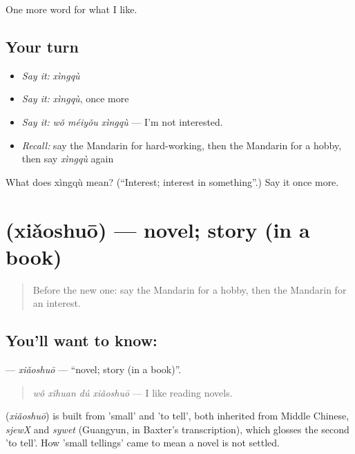 \begin{grammarlens}[title={What you've built}]
One more word for what I like.
\end{grammarlens}

\subsection*{Your turn}
\begin{itemize}
\raggedright
  \item \emph{Say it:} \emph{xìngqù}
  \item \emph{Say it:} \emph{xìngqù}, once more
  \item \emph{Say it:} \emph{wǒ méiyǒu xìngqù} — I'm not interested.
  \item \emph{Recall:} say the Mandarin for hard-working, then the Mandarin for a hobby, then say \emph{xìngqù} again
\end{itemize}

\begin{tcolorbox}[breakable,colback=teal!4,colframe=teal!35!black,title={Before you move on}]
What does xìngqù mean? (\textquotedblleft{}Interest; interest in something\textquotedblright{}.) Say it once more.
\end{tcolorbox}
\section[\texorpdfstring{\zh{小说} (xiǎoshuō)}{小说 (xiǎoshuō)}]{ (xiǎoshuō) — novel; story (in a book)}

\label{lesson:ZH-C250-xiaoshuo}



\begin{quote}
Before the new one: say the Mandarin for a hobby, then the Mandarin for an interest.
\end{quote}

\subsection*{You'll want to know: }
\textbf{} — \emph{xiǎoshuō} — \textquotedblleft{}novel; story (in a book)\textquotedblright{}.

\begin{quote}
\textbf{} \emph{wǒ xǐhuan dú xiǎoshuō} — I like reading novels.
\end{quote}

\begin{cousinweb}
\textbf{} (\emph{xiǎoshuō}) is built from  'small' and  'to tell', both inherited from Middle Chinese, \emph{sjewX} and \emph{sywet} (Guangyun, in Baxter's transcription), which glosses the second 'to tell'. How 'small tellings' came to mean a novel is not settled.
\end{cousinweb}

